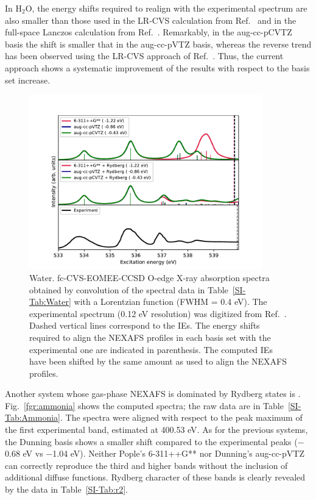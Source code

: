 \documentclass[journal=jctcce,manuscript=article]{achemso}
\begin{document}
In H$_2$O, the energy shifts required to realign with the experimental spectrum are also smaller than those used in 
the LR-CVS calculation from Ref.~  and in the full-space Lanczos calculation from Ref.~.
Remarkably, in the aug-cc-pCVTZ basis the shift is smaller that in the aug-cc-pVTZ basis, whereas the reverse trend has been observed using the LR-CVS approach of Ref.~. Thus, the current approach shows a systematic improvement of the results with respect to the basis set increase.

\begin{figure}[H]
  \includegraphics[width=0.9\textwidth]{Spectra/H2O.pdf}
  \caption{Water. fc-CVS-EOMEE-CCSD O-edge X-ray absorption spectra  obtained by convolution of the spectral data in Table~\ref{SI-Tab:Water} with a Lorentzian function (FWHM = 0.4 eV). The experimental spectrum (0.12 eV resolution) was digitized from Ref.~. \label{fgr:water}
Dashed vertical lines correspond to the IEs. The energy shifts 
required to align the NEXAFS profiles in each basis set with the experimental one are indicated in parenthesis.
The computed IEs have been shifted by the same amount as used to align the NEXAFS profiles.}
\end{figure}


Another system whose gas-phase NEXAFS is dominated by Rydberg states is . Fig.~\ref{fgr:ammonia} shows
the computed spectra; the raw data are 
in Table~\ref{SI-Tab:Ammonia}. The spectra were aligned with respect to the peak maximum of the first experimental band, estimated at 400.53 eV. As for the previous systems, the Dunning basis shows a smaller shift compared to the experimental peaks ($-$0.68 eV vs $-$1.04 eV). Neither Pople's 6-311++G** nor Dunning's aug-cc-pVTZ can correctly reproduce the third and higher bands without the inclusion of additional diffuse functions. Rydberg character of these bands is clearly
revealed by the data in Table~\ref{SI-Tab:r2}. 
\end{document}
